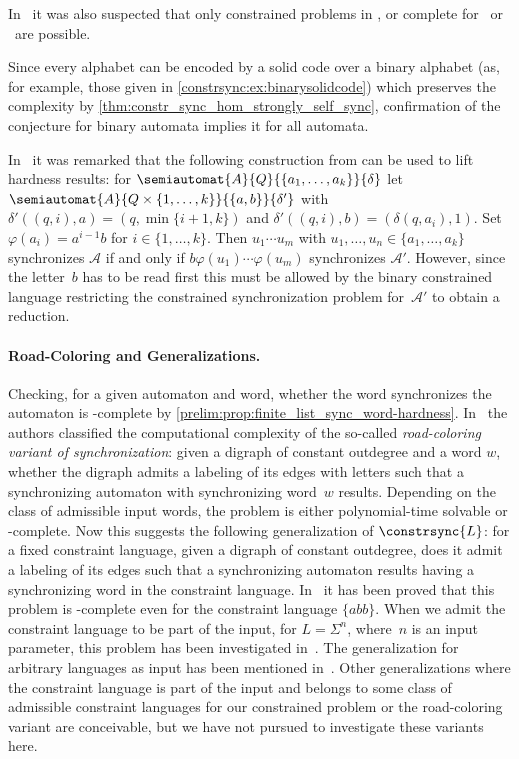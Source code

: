 In~\cite[Sec.~6]{DBLP:conf/cocoon/Hoffmann21} it was also suspected that only
constrained problems in \PTIME, or complete for \PSPACE\  or \NP\  are possible.

Since every alphabet can be encoded by a solid code over a binary alphabet (as, for example, those given
in \cref{constrsync:ex:binarysolidcode}) which preserves the complexity
by \cref{thm:constr_sync_hom_strongly_self_sync},
confirmation of the conjecture for binary automata implies it for all automata.

In~\cite[Rem.~30]{FernauGHHVW19} it was remarked that the following construction
from \cite[pp. 220-221]{DBLP:journals/mst/Berlinkov14}
can be used to lift hardness results: 
for $\semiautomat{A}{Q}{\{a_1, \ldots, a_k\}}{\delta}$
let $\semiautomat{A}{Q \times \{1,\ldots,k\}}{\{a,b\}}{\delta'}$
with $\delta'((q, i), a) = (q, \min\{i+1,k\})$
and $\delta'((q, i), b) = (\delta(q, a_i), 1)$.
Set $\varphi(a_i) = a^{i - 1}b$ for $i \in \{1,\ldots,k\}$.
Then $u_1 \cdots u_m$ with $u_1, \ldots, u_n \in \{a_1, \ldots, a_k\}$
synchronizes $\mathcal A$ if and only if $b\varphi(u_1) \cdots \varphi(u_m)$
synchronizes $\mathcal A'$. However, since the letter~$b$ has to be read
first this must be allowed by the binary constrained language
restricting the constrained synchronization problem for~$\mathcal A'$ to obtain a reduction.

\paragraph{Road-Coloring and Generalizations.} 
Checking, for a given automaton and word, whether the word synchronizes the automaton
is \LOGSPACE-complete by \cref{prelim:prop:finite_list_sync_word-hardness}.
In~\cite{DBLP:journals/jcss/VorelR19} the authors classified the computational complexity of the so-called \emph{road-coloring variant of synchronization}: 
given a digraph of constant outdegree and a word $w$, whether the digraph
admits a labeling of its edges with letters such that a synchronizing automaton with synchronizing
word~$w$ results. Depending on the class of admissible input words, the problem
is either polynomial-time solvable or \NP-complete.
Now this suggests the following generalization of $\constrsync{L}$: for a fixed constraint language,
given a digraph of constant outdegree, does it admit a labeling of its edges such
that a synchronizing automaton results having a synchronizing word in the constraint language.
In~\cite{DBLP:journals/jcss/VorelR19} it has been proved that this problem is \NP-complete
even for the constraint language $\{abb\}$.
When we admit the constraint language to be part of the input,
for $L = \Sigma^n$, where~$n$ is an input parameter, this problem has been investigated
in~\cite{ROMAN2015383,DBLP:journals/ipl/Roman11}. The generalization
for arbitrary languages as input has been mentioned 
in~\cite{DBLP:journals/ipl/Roman11,DBLP:journals/jcss/VorelR19}.
Other generalizations where the constraint language is part of the input and belongs
to some class of admissible constraint languages for our constrained problem or the road-coloring
variant are conceivable, but we have not pursued to investigate these variants here.